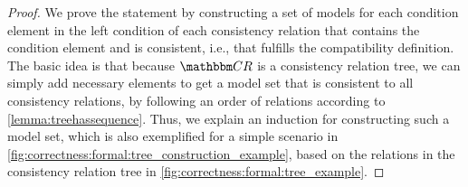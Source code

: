 \begin{proof}
    We prove the statement by constructing a set of models for each condition element in the left condition of each consistency relation that contains the condition element and is consistent, i.e., that fulfills the compatibility definition.
    The basic idea is that because $\consistencyrelationset{CR}$ is a consistency relation tree, we can simply add necessary elements to get a model set that is consistent to all consistency relations, by %
    following an order of relations according to \autoref{lemma:treehassequence}.
    Thus, we explain an induction for constructing such a model set, which is also exemplified for a simple scenario in \autoref{fig:correctness:formal:tree_construction_example}, based on the relations in the consistency relation tree in \autoref{fig:correctness:formal:tree_example}.
    

\end{proof}

